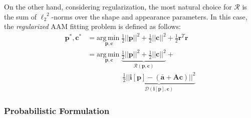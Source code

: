 On the other hand, considering regularization, the most natural choice for $\mathcal{R}$ is the sum of ${\ell_2}^2$-norms over the shape and appearance parameters. In this case, the \emph{regularized} AAM fitting problem is defined as follows:
\begin{equation}
    \begin{aligned}
        \mathbf{p}^*, \mathbf{c}^* & = \underset{\mathbf{p}, \mathbf{c}} {\mathrm{arg\, min\;}} \frac{1}{2}||\mathbf{p}||^2 + \frac{1}{2}||\mathbf{c}||^2 + \frac{1}{2} \mathbf{r}^T\mathbf{r}
        \\
        & =\underset{\mathbf{p}, \mathbf{c}} {\mathrm{arg\, min\;}} \underbrace{\frac{1}{2}||\mathbf{p}||^2 + \frac{1}{2}||\mathbf{c}||^2}_{\mathcal{R} (\mathbf{p}, \mathbf{c})} +
        \\
        & \qquad \qquad \quad \underbrace{\frac{1}{2}|| \mathbf{i}[\mathbf{p}] - (\mathbf{\bar{a}} + \mathbf{A} \mathbf{c}) ||^2}_{\mathcal{D} (\mathbf{i}[\mathbf{p}], \mathbf{c})}
    \end{aligned}
    \label{eq:rssd}
\end{equation}


\subsubsection*{Probabilistic Formulation}
\label{sec:rssd_pi}

